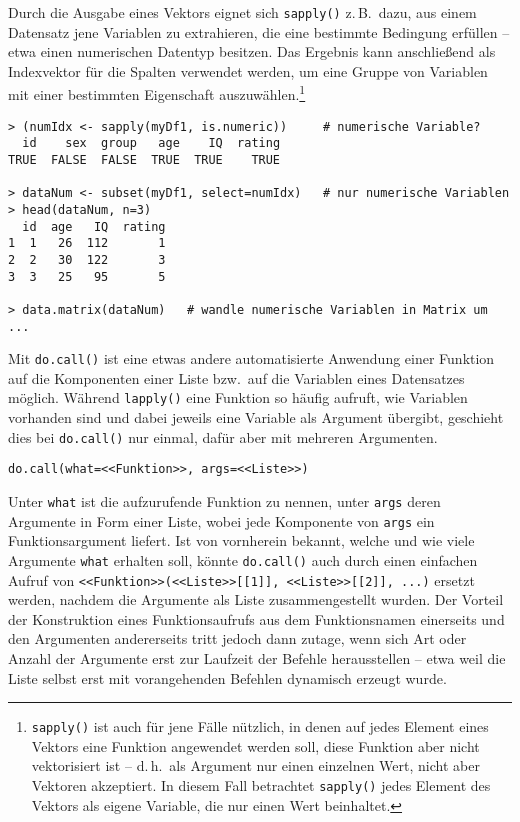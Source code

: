 Durch die Ausgabe eines Vektors eignet sich \lstinline!sapply()! z.\,B.\ dazu, aus einem Datensatz jene Variablen zu extrahieren, die eine bestimmte Bedingung erfüllen -- etwa einen numerischen Datentyp besitzen. Das Ergebnis kann anschließend als Indexvektor für die Spalten verwendet werden, um eine Gruppe von Variablen mit einer bestimmten Eigenschaft auszuwählen.\footnote{\lstinline!sapply()! ist auch für jene Fälle nützlich, in denen auf jedes Element eines Vektors eine Funktion angewendet werden soll, diese Funktion aber nicht vektorisiert ist -- d.\,h.\ als Argument nur einen einzelnen Wert, nicht aber Vektoren akzeptiert. In diesem Fall betrachtet \lstinline!sapply()! jedes Element des Vektors als eigene Variable, die nur einen Wert beinhaltet.}
\begin{lstlisting}
> (numIdx <- sapply(myDf1, is.numeric))     # numerische Variable?
  id    sex  group   age    IQ  rating
TRUE  FALSE  FALSE  TRUE  TRUE    TRUE

> dataNum <- subset(myDf1, select=numIdx)   # nur numerische Variablen
> head(dataNum, n=3)
  id  age   IQ  rating
1  1   26  112       1
2  2   30  122       3
3  3   25   95       5

> data.matrix(dataNum)   # wandle numerische Variablen in Matrix um ...
\end{lstlisting}

Mit \lstinline!do.call()! ist eine etwas andere automatisierte Anwendung einer Funktion auf die Komponenten einer Liste bzw.\ auf die Variablen eines Datensatzes möglich. Während \lstinline!lapply()! eine Funktion so häufig aufruft, wie Variablen vorhanden sind und dabei jeweils eine Variable als Argument übergibt, geschieht dies bei \lstinline!do.call()! nur einmal, dafür aber mit mehreren Argumenten.
\begin{lstlisting}
do.call(what=<<Funktion>>, args=<<Liste>>)
\end{lstlisting}

Unter \lstinline!what! ist die aufzurufende Funktion zu nennen, unter \lstinline!args! deren Argumente in Form einer Liste, wobei jede Komponente von \lstinline!args! ein Funktionsargument liefert. Ist von vornherein bekannt, welche und wie viele Argumente \lstinline!what! erhalten soll, könnte \lstinline!do.call()! auch durch einen einfachen Aufruf von \lstinline!<<Funktion>>(<<Liste>>[[1]], <<Liste>>[[2]], ...)! ersetzt werden, nachdem die Argumente als Liste zusammengestellt wurden. Der Vorteil der Konstruktion eines Funktionsaufrufs aus dem Funktionsnamen einerseits und den Argumenten andererseits tritt jedoch dann zutage, wenn sich Art oder Anzahl der Argumente erst zur Laufzeit der Befehle herausstellen -- etwa weil die Liste selbst erst mit vorangehenden Befehlen dynamisch erzeugt wurde.

